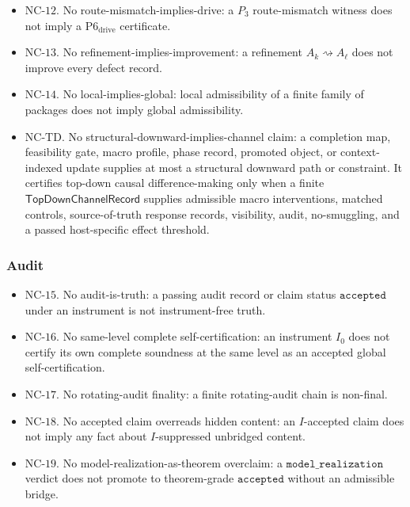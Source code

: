 \documentclass[11pt]{article}
\providecommand{\tightlist}{}
\theoremstyle{definition}
\begin{document}
\begin{itemize}
\tightlist
\item
  \(\mathrm{NC}\text{-}12\). No route-mismatch-implies-drive: a \(P_{3}\) route-mismatch witness does not imply a \(\mathrm{P6}_{\mathrm{drive}}\) certificate.
\item
  \(\mathrm{NC}\text{-}13\). No refinement-implies-improvement: a refinement \(A_{k}\rightsquigarrow A_{\ell}\) does not improve every defect record.
\item
  \(\mathrm{NC}\text{-}14\). No local-implies-global: local admissibility of a finite family of packages does not imply global admissibility.
\item
  \(\mathrm{NC}\text{-}\mathrm{TD}\). No structural-downward-implies-channel claim: a completion map, feasibility gate, macro profile, phase record, promoted object, or context-indexed update supplies at most a structural downward path or constraint. It certifies top-down causal difference-making only when a finite \(\mathsf{TopDownChannelRecord}\) supplies admissible macro interventions, matched controls, source-of-truth response records, visibility, audit, no-smuggling, and a passed host-specific effect threshold.
\end{itemize}

\subsubsection{Audit}

\begin{itemize}
\tightlist
\item
  \(\mathrm{NC}\text{-}15\). No audit-is-truth: a passing audit record or claim status \(\texttt{accepted}\) under an instrument is not instrument-free truth.
\item
  \(\mathrm{NC}\text{-}16\). No same-level complete self-certification: an instrument \(I_{0}\) does not certify its own complete soundness at the same level as an accepted global self-certification.
\item
  \(\mathrm{NC}\text{-}17\). No rotating-audit finality: a finite rotating-audit chain is non-final.
\item
  \(\mathrm{NC}\text{-}18\). No accepted claim overreads hidden content: an \(I\)-accepted claim does not imply any fact about \(I\)-suppressed unbridged content.
\item
  \(\mathrm{NC}\text{-}19\). No model-realization-as-theorem overclaim: a \(\texttt{model\_realization}\) verdict does not promote to theorem-grade \(\texttt{accepted}\) without an admissible bridge.
\end{itemize}
\end{document}
